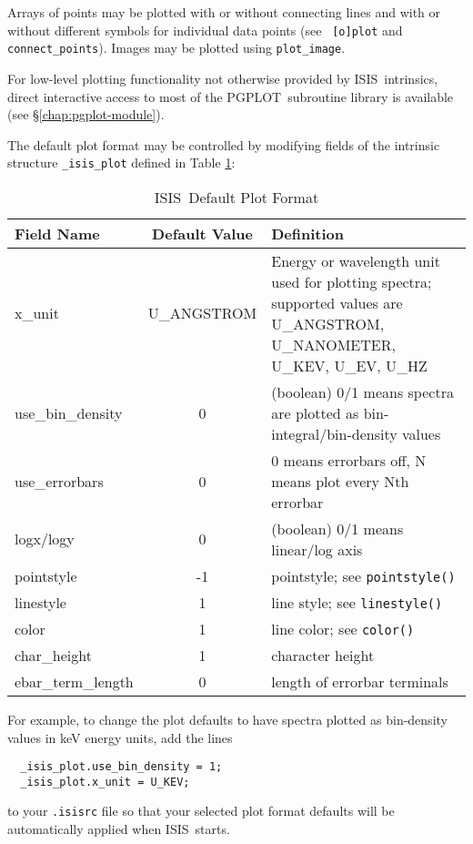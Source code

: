 \documentclass{book}
\newcommand{\isisx}{{\sc ISIS~}}
\newcommand{\pgplot}{{\sc PGPLOT}}
\begin{document}
Arrays of points may be plotted with or without connecting lines and
with or without different symbols for individual data points (see {\tt
[o]plot} and {\tt connect\_points}).  Images may be plotted using
\verb|plot_image|.

For low-level plotting functionality not otherwise provided by
\isisx intrinsics, direct interactive access to most of the \pgplot\
subroutine library is available (see \S\ref{chap:pgplot-module}).

The default plot format may be controlled by modifying fields
of the intrinsic structure {\tt \_isis\_plot} defined in
Table \ref{defaultplot-tbl}:
\begin{table}[ht] \caption{\isisx Default Plot Format}
\label{defaultplot-tbl}
\begin{tabular}{|l|c|p{3in}|}
\hline
Field Name & Default Value & Definition \\
\hline
 x\_unit & {\sc U\_ANGSTROM} & Energy or wavelength unit used for plotting spectra;
 supported values are {\sc U\_ANGSTROM}, {\sc U\_NANOMETER},
 {\sc U\_KEV}, {\sc U\_EV}, {\sc U\_HZ} \\
 use\_bin\_density & 0 & (boolean) 0/1 means spectra are plotted
 as bin-integral/bin-density values \\
 use\_errorbars & 0 & 0 means errorbars off, N means plot every Nth errorbar\\
 logx/logy    & 0 & (boolean) 0/1 means linear/log axis \\
 pointstyle   & -1 & pointstyle; see {\tt pointstyle()} \\
 linestyle    & 1 & line style; see {\tt linestyle()} \\
 color        & 1 & line color; see {\tt color()} \\
 char\_height & 1 & character height \\
 ebar\_term\_length & 0 & length of errorbar terminals \\
 \hline
\end{tabular}
\end{table}
For example, to change the plot defaults to have spectra plotted as
bin-density values in keV energy units, add the lines
\begin{verbatim}
  _isis_plot.use_bin_density = 1;
  _isis_plot.x_unit = U_KEV;
\end{verbatim}
to your \verb|.isisrc| file so that your selected plot format defaults
will be automatically applied when \isisx starts.
\end{document}
